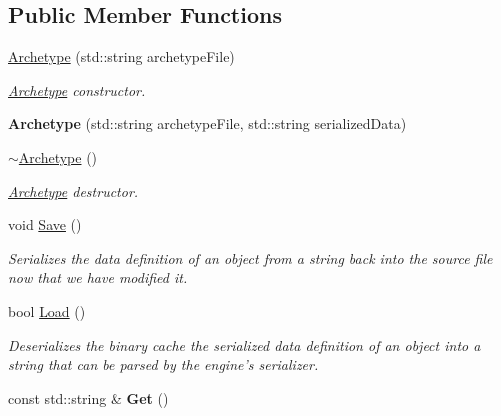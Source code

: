\subsection*{Public Member Functions}
\begin{DoxyCompactItemize}
\item 
\hyperlink{classDCEngine_1_1Archetype_add655dcfb7a575a8a3b2c05f90cc5608}{Archetype} (std\-::string archetype\-File)
\begin{DoxyCompactList}\small\item\em \hyperlink{classDCEngine_1_1Archetype}{Archetype} constructor. \end{DoxyCompactList}\item 
\hypertarget{classDCEngine_1_1Archetype_a42e05225f820f6ab2c1debaa4083e78d}{{\bfseries Archetype} (std\-::string archetype\-File, std\-::string serialized\-Data)}\label{classDCEngine_1_1Archetype_a42e05225f820f6ab2c1debaa4083e78d}

\item 
\hypertarget{classDCEngine_1_1Archetype_a3fcfb29bcc513063736d04016d249a88}{\hyperlink{classDCEngine_1_1Archetype_a3fcfb29bcc513063736d04016d249a88}{$\sim$\-Archetype} ()}\label{classDCEngine_1_1Archetype_a3fcfb29bcc513063736d04016d249a88}

\begin{DoxyCompactList}\small\item\em \hyperlink{classDCEngine_1_1Archetype}{Archetype} destructor. \end{DoxyCompactList}\item 
\hypertarget{classDCEngine_1_1Archetype_a62445a186a0f9dcf67a446bd7113d082}{void \hyperlink{classDCEngine_1_1Archetype_a62445a186a0f9dcf67a446bd7113d082}{Save} ()}\label{classDCEngine_1_1Archetype_a62445a186a0f9dcf67a446bd7113d082}

\begin{DoxyCompactList}\small\item\em Serializes the data definition of an object from a string back into the source file now that we have modified it. \end{DoxyCompactList}\item 
\hypertarget{classDCEngine_1_1Archetype_ae8d40719f79ca2a5ec7ec40c6a7da65c}{bool \hyperlink{classDCEngine_1_1Archetype_ae8d40719f79ca2a5ec7ec40c6a7da65c}{Load} ()}\label{classDCEngine_1_1Archetype_ae8d40719f79ca2a5ec7ec40c6a7da65c}

\begin{DoxyCompactList}\small\item\em Deserializes the binary cache the serialized data definition of an object into a string that can be parsed by the engine's serializer. \end{DoxyCompactList}\item 
\hypertarget{classDCEngine_1_1Archetype_a57831897d4909bde4a7a1f64abed514c}{const std\-::string \& {\bfseries Get} ()}\label{classDCEngine_1_1Archetype_a57831897d4909bde4a7a1f64abed514c}

\end{DoxyCompactItemize}
